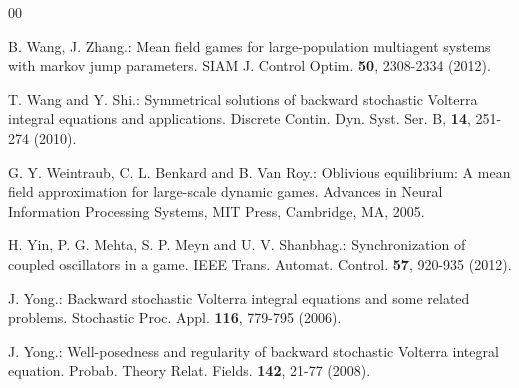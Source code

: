 \documentclass[11pt]{article}
\begin{document}
\begin{thebibliography}{00}

 B. Wang, J. Zhang.: Mean field games for large-population multiagent systems
with markov jump parameters. SIAM J. Control Optim. \textbf{50},
2308-2334 (2012).

 T. Wang and Y. Shi.: Symmetrical solutions of backward stochastic Volterra integral
equations and applications. Discrete Contin. Dyn. Syst. Ser. B, \textbf{14}, 251-274 (2010).


 G. Y. Weintraub, C. L. Benkard and B. Van Roy.:
Oblivious equilibrium: A mean field approximation for
large-scale dynamic games. Advances in Neural Information
Processing Systems, MIT Press, Cambridge, MA, 2005.

 H. Yin, P. G. Mehta, S. P. Meyn and U. V.
Shanbhag.: Synchronization of coupled oscillators in a game.
IEEE Trans. Automat. Control. \textbf{57}, 920-935 (2012).

 J. Yong.: Backward stochastic Volterra integral
equations and some related problems. Stochastic Proc. Appl. \textbf{116}, 779-795 (2006).


 J. Yong.: Well-posedness and
regularity of backward stochastic Volterra integral equation.
Probab. Theory Relat. Fields. \textbf{142}, 21-77 (2008).
%
%







\end{thebibliography}
\end{document}
